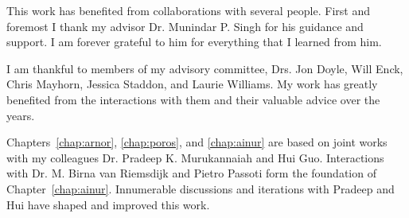 \begin{acknowledgements}

This work has benefited from collaborations with several people.
First and foremost I thank my advisor Dr. Munindar P. Singh for his guidance and support. 
I am forever grateful to him for everything that I learned from him. 

I am thankful to members of my advisory committee, Drs. Jon Doyle, Will Enck, Chris Mayhorn, Jessica Staddon, and Laurie Williams. 
My work has greatly benefited from the interactions with them and their valuable advice over the years. 

Chapters~\ref{chap:arnor}, \ref{chap:poros}, and \ref{chap:ainur} are based on joint
works with my colleagues Dr. Pradeep K. Murukannaiah and Hui Guo. 
Interactions with Dr. M. Birna van Riemsdijk and Pietro Passoti form the foundation of Chapter~\ref{chap:ainur}.
Innumerable discussions and iterations with Pradeep and Hui have shaped and improved this work. 


\end{acknowledgements}

